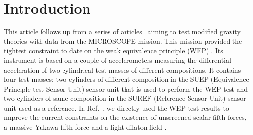 \documentclass[aps,prd,twocolumn,superscriptaddress,nofootinbib,eqsecnumm,showpacs]{revtex4-1}
\renewcommand\({\left(}
\renewcommand\){\right)}
\renewcommand\[{\left[}
\renewcommand\]{\right]}
\begin{document}
\maketitle

\section{Introduction}

This article follows up from a series of articles~\cite{PRD1, PRD2,PRD3} aiming to test modified gravity theories with data from the MICROSCOPE mission. This mission provided the tightest constraint to date on  the weak equivalence principle (WEP) \cite{touboul_microscope_2017, Touboul_2019}. Its instrument is based on a couple of accelerometers measuring  the differential acceleration of two cylindrical test masses of different compositions. It contains four test masses: two cylinders of different composition in the SUEP (Equivalence Principle test Sensor Unit) sensor unit that is used to perform the WEP test and two cylinders of same composition in the SUREF (Reference Sensor Unit) sensor unit used as a reference. In Ref.~\cite{PRL}, we directly used the WEP test results to improve the current constraints on the existence of unscreened scalar fifth forces, a massive Yukawa fifth force and a light dilaton field \cite{PhysRevD.82.084033}.
\end{document}
